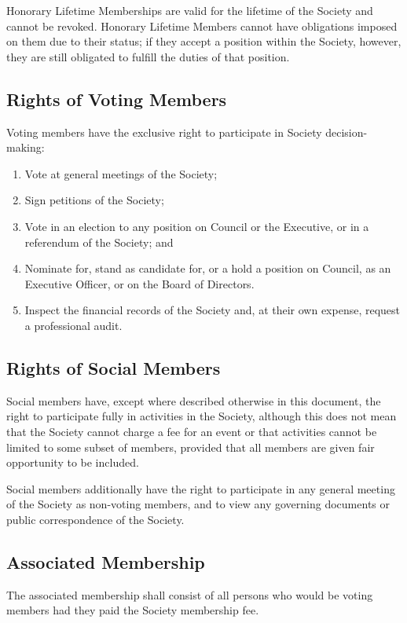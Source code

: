 Honorary Lifetime Memberships are valid for the lifetime of the Society and
cannot be revoked. Honorary Lifetime Members cannot have obligations imposed on
them due to their status; if they accept a position within the Society, however,
they are still obligated to fulfill the duties of that position.

\subsection{Rights of Voting Members}
Voting members have the exclusive right to participate in Society
decision-making:
\begin{enumerate}
  \item Vote at general meetings of the Society;
  \item Sign petitions of the Society;
  \item Vote in an election to any position on Council or the
      Executive, or in a referendum of the Society; and
  \item Nominate for, stand as candidate for, or a hold a position on 
      Council, as an Executive Officer, or on the Board of Directors.
  \item Inspect the financial records of the Society and, at their own expense,
    request a professional audit.
\end{enumerate}

\subsection{Rights of Social Members}
Social members have, except where described otherwise in this document, the
right to participate fully in activities in the Society, although this does not
mean that the Society cannot charge a fee for an event or that activities cannot
be limited to some subset of members, provided that all members are given fair
opportunity to be included.

Social members additionally have the right to participate in any general meeting
of the Society as non-voting members, and to view any governing documents or
public correspondence of the Society.

\subsection{Associated Membership}
The associated membership shall consist of all persons who would be voting members
had they paid the Society membership fee.
